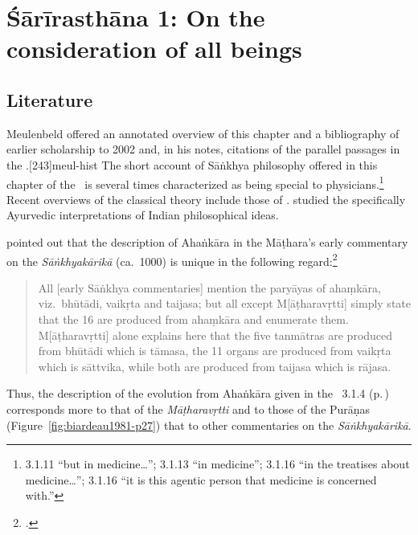 
\chapter{Śārīrasthāna 1:  On the consideration of all beings}



\section{Literature} 

Meulenbeld offered an annotated overview of this chapter and a
bibliography of earlier scholarship to
2002 and, in his notes, citations of the parallel passages in the 
\CS.[243]{meul-hist}   The short account of Sāṅkhya philosophy 
offered in this chapter of the \SS\ is several times characterized as being special 
to physicians.\footnote{3.1.11  ``but in medicine\ldots''; 
3.1.13  ``in medicine''; 3.1.16  ``in the 
treatises about medicine\ldots ''; 3.1.16  ``it is this agentic person that medicine is 
concerned with.''} Recent overviews of the classical theory include those of 
\textcites{ruzs-2025}[ch.\,22]{adam-2022}[\S2.4]{chat-2021}.
\citet{comb-2011} studied the specifically Ayurvedic interpretations of Indian 
philosophical ideas.

\citeauthor{solo-1974} pointed out that the description of Ahaṅkāra in the 
Māṭhara's early commentary on the \emph{Sāṅkhyakārikā} (ca.\ 1000) is 
unique in the following regard:\footcite[52, 180]{solo-1974}
\begin{quote}
    All [early Sāṅkhya commentaries]
    mention the paryāyas of ahaṃkāra, viz.\ bhūtādi, vaikṛta
    and taijasa; but all except M[āṭharavṛtti] simply state that the 16
    are produced from ahaṃkāra and enumerate them. M[āṭharavṛtti] 
    alone explains here that the five tanmātras are produced
    from bhūtādi which is tāmasa, the 11 organs are
    produced from vaikṛta which is sāttvika, while both
    are produced from taijasa which is rājasa.     
\end{quote}
Thus, the description of the evolution from Ahaṅkāra given in the \SS\ 3.1.4 
(p.\,\pageref{3.1.4}) corresponds more to that of the \textit{Māṭharavṛtti} and 
to those of the Purāṇas (Figure~\ref{fig:biardeau1981-p27}) that to other 
commentaries on the \emph{Sāṅkhyakārikā}.

